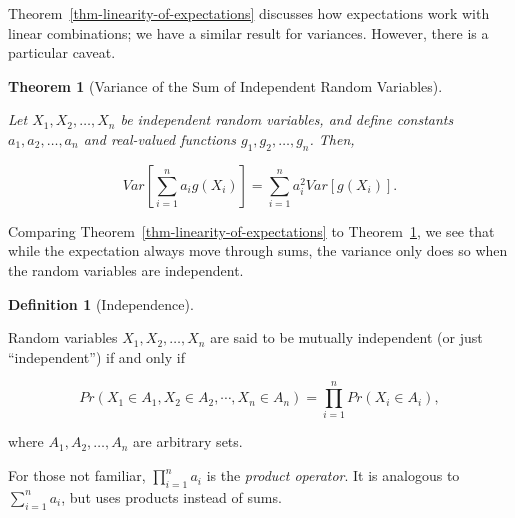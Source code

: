 \documentclass[
  letterpaper,
  DIV=11,
  numbers=noendperiod]{scrreprt}
\theoremstyle{definition}
\newtheorem{definition}{Definition}[chapter]
\theoremstyle{plain}
\newtheorem{theorem}{Theorem}[chapter]
\theoremstyle{definition}
\theoremstyle{remark}
\begin{document}
Theorem~\ref{thm-linearity-of-expectations} discusses how expectations
work with linear combinations; we have a similar result for variances.
However, there is a particular caveat.

\begin{theorem}[Variance of the Sum of Independent Random
Variables]\protect\hypertarget{thm-variance-independent-sum}{}\label{thm-variance-independent-sum}

Let \(X_1, X_2, \dotsc, X_n\) be independent random variables, and
define constants \(a_1, a_2, \dotsc, a_n\) and real-valued functions
\(g_1, g_2, \dotsc, g_n\). Then,

\[Var\left[\sum_{i=1}^{n} a_i g\left(X_i\right)\right] = \sum_{i=1}^{n} a^2_i Var\left[g\left(X_i\right)\right].\]

\end{theorem}

Comparing Theorem~\ref{thm-linearity-of-expectations} to
Theorem~\ref{thm-variance-independent-sum}, we see that while the
expectation always move through sums, the variance only does so when the
random variables are independent.

\begin{definition}[Independence]\protect\hypertarget{def-independence}{}\label{def-independence}

Random variables \(X_1, X_2, \dotsc, X_n\) are said to be mutually
independent (or just ``independent'') if and only if

\[Pr\left(X_1 \in A_1, X_2 \in A_2, \dotsb, X_n \in A_n\right) = \prod_{i=1}^{n} Pr\left(X_i \in A_i\right),\]

where \(A_1, A_2, \dotsc, A_n\) are arbitrary sets.

\end{definition}

\begin{tcolorbox}[enhanced jigsaw, rightrule=.15mm, leftrule=.75mm, opacityback=0, coltitle=black, bottomrule=.15mm, opacitybacktitle=0.6, left=2mm, colframe=quarto-callout-note-color-frame, breakable, colback=white, arc=.35mm, toprule=.15mm, toptitle=1mm, bottomtitle=1mm, title=\textcolor{quarto-callout-note-color}{\faInfo}\hspace{0.5em}{Note}, titlerule=0mm, colbacktitle=quarto-callout-note-color!10!white]

For those not familiar, \(\prod_{i=1}^n a_i\) is the \emph{product
operator}. It is analogous to \(\sum_{i=1}^{n} a_i\), but uses products
instead of sums.

\end{tcolorbox}
\end{document}
